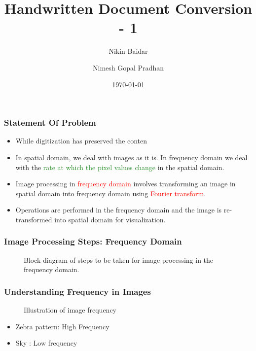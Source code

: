 \documentclass[compress]{beamer}
\title{Handwritten Document Conversion - 1}
\author{Nikin Baidar \and Nimesh Gopal Pradhan}
\date{\today}
\begin{document}
\begingroup
{}
\begin{frame}
  \titlepage
\end{frame}
\endgroup

\begingroup
\addtocounter{framenumber}{-1}

\iffalse

  \begin{frame}[t]
    \frametitle{Statement Of Problem}

    \vskip 10pt

    \begin{itemize}

      \item While digitization has preserved the conten        \vskip 10pt

      \item In spatial domain, we deal with images as it is. In frequency
        domain we deal with the \textcolor{ForestGreen}{rate at which the pixel values
        change} in the spatial domain. \vskip 10pt

      \item Image processing in \textcolor{red}{frequency domain} involves
        transforming an image in spatial domain into frequency domain using
        \textcolor{red}{Fourier transform}. \vskip 10pt

      \item Operations are performed in the frequency domain and the image is
        re-transformed into spatial domain for visualization.

    \end{itemize}

  \end{frame}

  \begin{frame}
    \frametitle{Image Processing Steps: Frequency Domain}

    \begin{figure}[H]
      \centering
      \caption{Block diagram of steps to be taken for image processing in the
      frequency domain.}
      \label{fig:}
    \end{figure}
  \end{frame}
  

  \begin{frame}
    \frametitle{Understanding Frequency in Images}

    \begin{figure}[H]
      \centering
      \caption{Illustration of image frequency}
      \label{fig:}
    \end{figure}

    \begin{itemize}
      \item Zebra pattern: High Frequency
      \item Sky : Low frequency
    \end{itemize}
    
  \end{frame}
\end{document}
